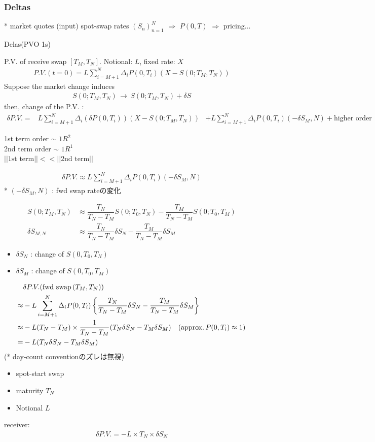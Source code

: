 \documentclass[a4paper,11pt]{jsarticle}
\theoremstyle{definition}
\newcommand{\df}[2]{\dfrac{#1}{#2}}
\begin{document}
\subsubsection{Deltas}
* market quotes (input) spot-swap rates $(S_n)_{n=1}^N$
$\Rightarrow$ $P(0,T)$ $\Rightarrow$ pricing...

Delas(PVO 1s)


P.V. of receive swap $[T_M, T_N]$.
Notional: $L$, fixed rate: $X$
\begin{align}
  P.V.(t=0)=L\sum_{i=M+1}^N\Delta_i P(0,T_i)(X-S(0;T_M,T_N))
\end{align}
Suppose the market change induces
\begin{align}
  S(0;T_M,T_N) \, \rightarrow \, S(0;T_M,T_N) + \delta S
\end{align}
then, change of the P.V. :
\begin{align}
  \delta P.V.=&L\sum_{i=M+1}^N\Delta_i(\delta P(0,T_i))
  (X-S(0;T_M,T_N))
  &+L\sum_{i=M+1}^N\Delta_i P(0,T_i)
  (-\delta S_M,N) + \mbox{higher order}
\end{align}

1st term order $\sim$ $1R^2$ \\
2nd term order $\sim$ $1R^1$ \\
$||\mbox{1st term}|| << ||\mbox{2nd term}||$

\begin{align}
  \delta P.V. \approx L\sum_{i=M+1}^N\Delta_i P(0,T_i)
  (-\delta S_M,N)
\end{align}
* $(-\delta S_M,N)$ : fwd swap rateの変化


\begin{align}
  S(0;T_M,T_N)&\approx\df{T_N}{T_N-T_M}S(0;T_0,T_N)
  -\df{T_M}{T_N-T_M}S(0;T_0,T_M) \\
  \delta S_{M,N}&\approx\df{T_N}{T_N-T_M}\delta S_N
  -\df{T_M}{T_N-T_M}\delta S_M
\end{align}

\begin{itemize}
  \item $\delta S_N$ : change of $S(0,T_0,T_N)$
  \item $\delta S_M$ : change of $S(0,T_0,T_M)$ 
\end{itemize}

\begin{align}
  &\delta P.V. (\mbox{fwd swap} \, (T_M,T_N)) \notag\\
  \approx& -L\sum_{i=M+1}^N\Delta_i P(0,T_i)
  \left\{\df{T_N}{T_N-T_M}\delta S_N
  -\df{T_M}{T_N-T_M}\delta S_M \right\} \notag \\
  \approx&-L(T_N-T_M)\times \df{1}{T_N-T_M}
  (T_N\delta S_N-T_M\delta S_M) \quad
  (\mbox{approx.}\, P(0,T_i)\approx 1 ) \notag \\
  =&-L(T_N\delta S_N-T_M \delta S_M)
\end{align}
(* day-count conventionのズレは無視)

\begin{itemize}
  \item spot-start swap
  \item maturity $T_N$
  \item Notional $L$
\end{itemize}
receiver:
\begin{align}
  \delta P.V.=-L\times T_N\times\delta S_N
\end{align}
\end{document}
